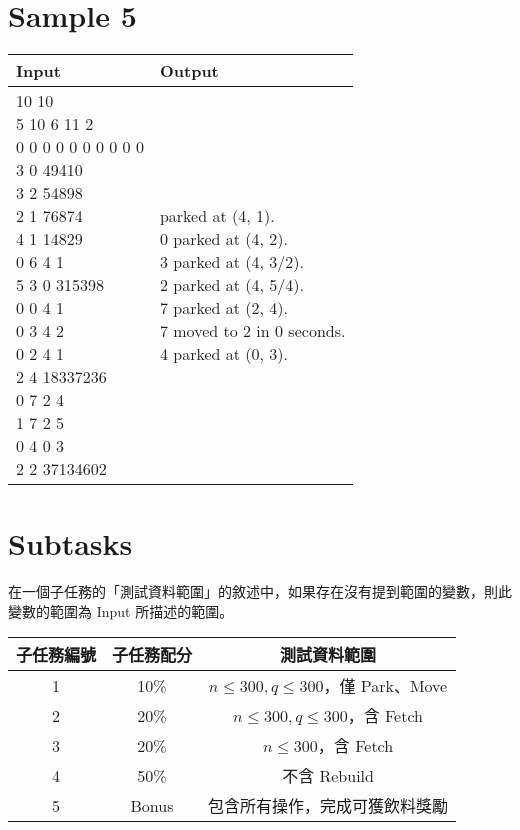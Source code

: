\documentclass[11pt,a4paper]{article}
\begin{document}
\section*{Sample 5}
\begin{longtable}[!h]{|p{}|p{}|}
\hline
\textbf{Input} & \textbf{Output} \\
\hline
\parbox[t]{0.5\textwidth}{ 10 10\\
5 10 6 11 2\\
0 0 0 0 0 0 0 0 0 0\\
3 0 49410\\
3 2 54898\\
2 1 76874\\
4 1 14829\\
0 6 4 1\\
5 3 0 315398\\
0 0 4 1\\
0 3 4 2\\
0 2 4 1\\
2 4 18337236\\
0 7 2 4\\
1 7 2 5\\
0 4 0 3\\
2 2 37134602\\
}
&
\parbox[t]{0.5\textwidth}{ parked at (4, 1).\\
0 parked at (4, 2).\\
3 parked at (4, 3/2).\\
2 parked at (4, 5/4).\\
7 parked at (2, 4).\\
7 moved to 2 in 0 seconds.\\
4 parked at (0, 3).
} \\
\hline
\end{longtable}



\section*{Subtasks}

在一個子任務的「測試資料範圍」的敘述中，如果存在沒有提到範圍的變數，則此變數的範圍為 Input 所描述的範圍。

\begin{center}
 \begin{tabular}{||c c c||} 
 \hline
 子任務編號 & 子任務配分 & 測試資料範圍 \\  
 \hline
 \hline
 1 & 10\% & $n \le 300, q \le 300$，僅 Park、Move \\ 
 \hline
 2 & 20\% & $n \le 300, q \le 300$，含 Fetch \\
 \hline 
 3 & 20\% & $n \le 300$，含 Fetch \\
 \hline
 4 & 50\% & 不含 Rebuild \\
 \hline
 5 & Bonus & 包含所有操作，完成可獲飲料獎勵 \\
 \hline
\end{tabular}
\end{center}
\end{document}
